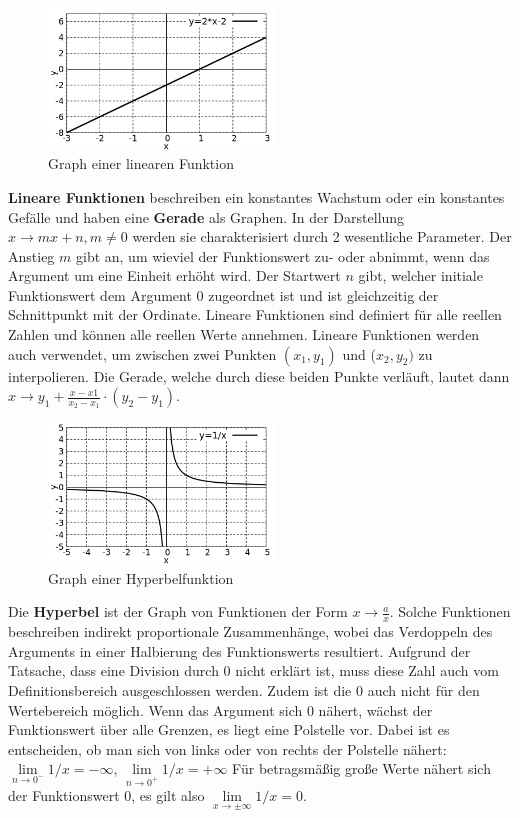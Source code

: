 \begin{minipage}[t]{1\textwidth}
    \begin{figure}
        \centering
        \includegraphics[width=6cm]{./gnuplot/base-function-linear}
        \caption{Graph einer linearen Funktion}
        \label{fig:ExBaseFunLin}
    \end{figure}
    \textbf{Lineare Funktionen} beschreiben ein konstantes Wachstum oder ein konstantes Gefälle und haben eine \textbf{Gerade} als Graphen. In der Darstellung $x \to mx+n, m\ne 0$ werden sie charakterisiert durch 2 wesentliche Parameter. Der Anstieg $m$ gibt an, um wieviel der Funktionswert zu- oder abnimmt, wenn das Argument um eine Einheit erhöht wird. Der Startwert $n$ gibt, welcher initiale Funktionswert dem Argument $0$ zugeordnet ist und ist gleichzeitig der Schnittpunkt mit der Ordinate. Lineare Funktionen sind definiert für alle reellen Zahlen und können alle reellen Werte annehmen. Lineare Funktionen werden auch verwendet, um zwischen zwei Punkten $(x_1,y_1)$ und ($x_2,y_2)$ zu interpolieren. Die Gerade, welche durch diese beiden Punkte verläuft, lautet dann $x \to y_1 + \frac{x-x1}{x_2-x_1} \cdot (y_2-y_1)$.
\end{minipage}

\begin{minipage}[t]{1\textwidth}
    \begin{figure}
        \centering
        \includegraphics[width=6cm]{./gnuplot/base-function-hyperbola}
        \caption{Graph einer Hyperbelfunktion}
        \label{fig:ExBaseFunHyperbola}
    \end{figure}
    Die \textbf{Hyperbel} ist der Graph von Funktionen der Form $x \to \frac{a}{x}$. Solche Funktionen beschreiben indirekt proportionale Zusammenhänge, wobei das Verdoppeln des Arguments in einer Halbierung des Funktionswerts resultiert. Aufgrund der Tatsache, dass eine Division durch $0$ nicht erklärt ist, muss diese Zahl auch vom Definitionsbereich ausgeschlossen werden. Zudem ist die $0$ auch nicht für den Wertebereich möglich. Wenn das Argument sich $0$ nähert, wächst der Funktionswert über alle Grenzen, es liegt eine Polstelle vor. Dabei ist es entscheiden, ob man sich von links oder von rechts der Polstelle nähert: $\lim\limits_{n\to 0^-} 1/x = -\infty$, $\lim\limits_{n\to 0^+} 1/x = +\infty$ Für betragsmäßig große Werte nähert sich der Funktionswert $0$, es gilt also $\lim\limits_{x\to\pm\infty} 1/x = 0$.
\end{minipage}

